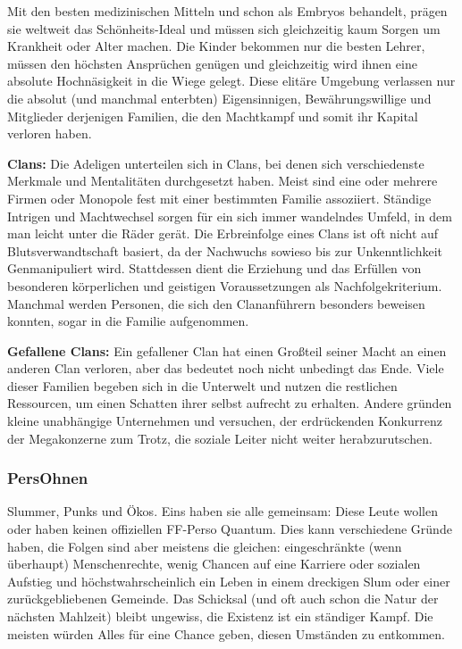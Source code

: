 Mit den besten medizinischen Mitteln und schon als Embryos behandelt, prägen sie weltweit das Schönheits-Ideal und müssen sich gleichzeitig kaum Sorgen um Krankheit oder Alter machen. Die Kinder bekommen nur die besten Lehrer, müssen den höchsten Ansprüchen genügen und gleichzeitig wird ihnen eine absolute Hochnäsigkeit in die Wiege gelegt. Diese elitäre Umgebung verlassen nur die absolut (und manchmal enterbten) Eigensinnigen, Bewährungswillige und Mitglieder derjenigen Familien, die den Machtkampf und somit ihr Kapital verloren haben.

\textbf{Clans:} Die Adeligen unterteilen sich in Clans, bei denen sich verschiedenste Merkmale und Mentalitäten durchgesetzt haben. Meist sind eine oder mehrere Firmen oder Monopole fest mit einer bestimmten Familie assoziiert. Ständige Intrigen und Machtwechsel sorgen für ein sich immer wandelndes Umfeld, in dem man leicht unter die Räder gerät.
Die Erbreinfolge eines Clans ist oft nicht auf Blutsverwandtschaft basiert, da der Nachwuchs sowieso bis zur Unkenntlichkeit Genmanipuliert wird. Stattdessen dient die Erziehung und das Erfüllen von besonderen körperlichen und geistigen Voraussetzungen als \glqq Nachfolgekriterium\grqq. Manchmal werden Personen, die sich den Clananführern besonders beweisen konnten, sogar in die Familie aufgenommen.

\textbf{Gefallene Clans:} Ein gefallener Clan hat einen Großteil seiner Macht an einen anderen Clan verloren, aber das bedeutet noch nicht unbedingt das Ende. Viele dieser Familien begeben sich in die Unterwelt und nutzen die restlichen Ressourcen, um einen Schatten ihrer selbst aufrecht zu erhalten. Andere gründen kleine unabhängige Unternehmen und versuchen, der erdrückenden Konkurrenz der Megakonzerne zum Trotz, die soziale Leiter nicht weiter herabzurutschen.
\subsubsection{PersOhnen}
Slummer, Punks und Ökos. Eins haben sie alle gemeinsam: Diese Leute wollen oder haben keinen offiziellen FF-Perso Quantum. Dies kann verschiedene Gründe haben, die Folgen sind aber meistens die gleichen: eingeschränkte (wenn überhaupt) Menschenrechte, wenig Chancen auf eine Karriere oder sozialen Aufstieg und höchstwahrscheinlich ein Leben in einem dreckigen Slum oder einer zurückgebliebenen Gemeinde. Das Schicksal (und oft auch schon die Natur der nächsten Mahlzeit) bleibt ungewiss, die Existenz ist ein ständiger Kampf. Die meisten würden Alles für eine Chance geben, diesen Umständen zu entkommen.

